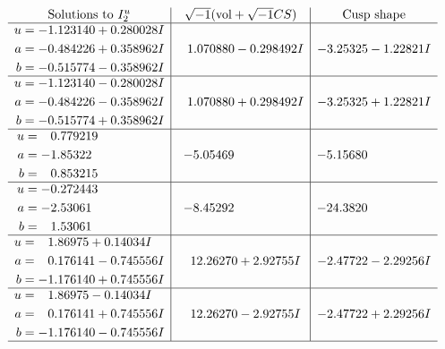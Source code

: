 \documentclass[1p]{elsarticle_modified}
\theoremstyle{definition}
\newcommand{\I}{\sqrt{-1}}
\begin{document}
$$\begin{array}{c|c|c}  
\text{Solutions to }I^u_{2}& \I (\text{vol} + \sqrt{-1}CS) & \text{Cusp shape}\\
 \hline 
\begin{aligned}
u &= -1.123140 + 0.280028 I \\
a &= -0.484226 + 0.358962 I \\
b &= -0.515774 - 0.358962 I\end{aligned}
 & \phantom{-}1.070880 - 0.298492 I & -3.25325 - 1.22821 I \\ \hline\begin{aligned}
u &= -1.123140 - 0.280028 I \\
a &= -0.484226 - 0.358962 I \\
b &= -0.515774 + 0.358962 I\end{aligned}
 & \phantom{-}1.070880 + 0.298492 I & -3.25325 + 1.22821 I \\ \hline\begin{aligned}
u &= \phantom{-}0.779219\phantom{ +0.000000I} \\
a &= -1.85322\phantom{ +0.000000I} \\
b &= \phantom{-}0.853215\phantom{ +0.000000I}\end{aligned}
 & -5.05469\phantom{ +0.000000I} & -5.15680\phantom{ +0.000000I} \\ \hline\begin{aligned}
u &= -0.272443\phantom{ +0.000000I} \\
a &= -2.53061\phantom{ +0.000000I} \\
b &= \phantom{-}1.53061\phantom{ +0.000000I}\end{aligned}
 & -8.45292\phantom{ +0.000000I} & -24.3820\phantom{ +0.000000I} \\ \hline\begin{aligned}
u &= \phantom{-}1.86975 + 0.14034 I \\
a &= \phantom{-}0.176141 - 0.745556 I \\
b &= -1.176140 + 0.745556 I\end{aligned}
 & \phantom{-}12.26270 + 2.92755 I & -2.47722 - 2.29256 I \\ \hline\begin{aligned}
u &= \phantom{-}1.86975 - 0.14034 I \\
a &= \phantom{-}0.176141 + 0.745556 I \\
b &= -1.176140 - 0.745556 I\end{aligned}
 & \phantom{-}12.26270 - 2.92755 I & -2.47722 + 2.29256 I\\
 \hline 
 \end{array}$$\newpage
\end{document}
